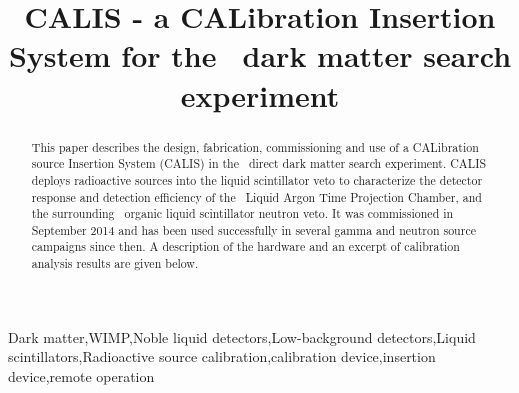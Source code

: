 \documentclass{elsarticle}
\begin{document}
\begin{frontmatter}
\title{CALIS - a CALibration Insertion System for the \dsf\, dark matter search experiment}
%
%


\begin{abstract}
This paper describes the design, fabrication, commissioning and use of  a CALibration source Insertion System (CALIS) in the \dsf\ direct dark matter search experiment. CALIS  deploys radioactive sources into the liquid scintillator veto to characterize the detector response and detection efficiency of the \dsf\ Liquid Argon Time Projection Chamber, and the surrounding \lsvscintillatormass\ organic liquid scintillator neutron veto.
It was commissioned in September 2014 and has been used successfully in several gamma and neutron source campaigns since then. A description of the hardware and an excerpt of calibration analysis results are given below.


\end{abstract}
\begin{keyword}


Dark matter\sep WIMP\sep Noble liquid detectors\sep Low-background detectors\sep Liquid scintillators\sep Radioactive source calibration\sep calibration device\sep insertion device\sep remote operation

\end{keyword}

\end{frontmatter}
\end{document}
